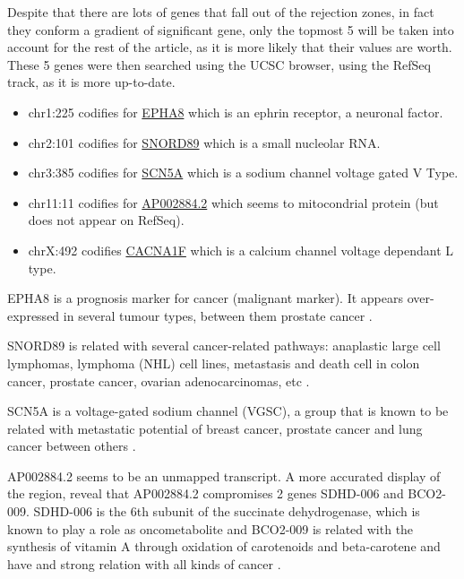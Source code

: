 \documentclass[9pt,twocolumn,twoside]{gsajnl}
\begin{document}
Despite that there are lots of genes that fall out of the rejection zones, in fact they conform a gradient of significant gene, only the topmost 5 will be taken into account for the rest of the article, as it is more likely that their values are worth. These 5 genes were then searched using the UCSC browser, using the RefSeq track, as it is more up-to-date.
\begin{itemize}
\item chr1:225 codifies for \href{http://www.genecards.org/cgi-bin/carddisp.pl?gene=EPHA8}{EPHA8} which is an ephrin receptor, a neuronal factor.
\item chr2:101 codifies for \href{http://www.genecards.org/cgi-bin/carddisp.pl?gene=SNORD89}{SNORD89} which is a small nucleolar RNA.
\item chr3:385 codifies for \href{http://www.genecards.org/cgi-bin/carddisp.pl?gene=SCN5A}{SCN5A} which is a sodium channel voltage gated V Type.
\item chr11:11 codifies for \href{http://www.ensembl.org/Homo_sapiens/Gene/Summary?g=ENSG00000255292;r=11:112086903-112193805}{AP002884.2} which seems to mitocondrial protein (but does not appear on RefSeq).
\item chrX:492 codifies \href{http://www.genecards.org/cgi-bin/carddisp.pl?gene=CACNA1F}{CACNA1F} which is a calcium channel voltage dependant L type.
\end{itemize}

EPHA8 is a prognosis marker for cancer (malignant marker). It appears over-expressed in several tumour types, between them prostate cancer \cite{proteinatlas}.

SNORD89 is related with several cancer-related pathways:  anaplastic large cell lymphomas, lymphoma (NHL) cell lines, metastasis and death cell in colon cancer, prostate cancer, ovarian adenocarcinomas, etc \cite{tcng}.

SCN5A is a voltage-gated sodium channel (VGSC), a group that is known to be related with metastatic potential of breast cancer, prostate cancer and lung cancer between others \cite{Nelson2015}.

AP002884.2 seems to be an unmapped transcript. A more accurated display of the region, reveal that AP002884.2 compromises 2 genes SDHD-006 and BCO2-009. SDHD-006 is the 6th subunit of the succinate dehydrogenase, which is known to play a role as oncometabolite \cite{oncometabolites} and BCO2-009 is related with the synthesis of vitamin A through oxidation of carotenoids  and beta-carotene and have and strong relation with all kinds of cancer \cite{proteinatlas}.
\end{document}

